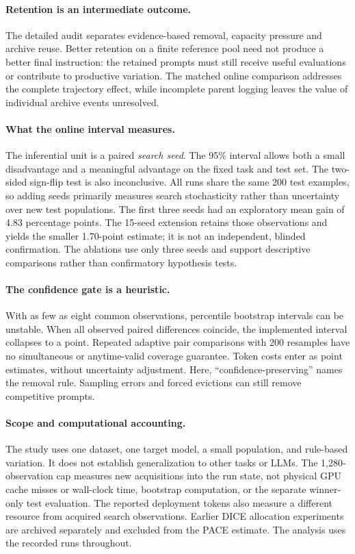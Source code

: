 \documentclass{article}
\begin{document}
\paragraph{Retention is an intermediate outcome.}
The detailed audit separates evidence-based removal, capacity pressure and
archive reuse. Better retention on a finite reference pool need not produce a
better final instruction: the retained prompts must still receive useful
evaluations or contribute to productive variation. The matched online comparison
addresses the complete trajectory effect, while incomplete parent logging leaves
the value of individual archive events unresolved.

\paragraph{What the online interval measures.}
The inferential unit is a paired \emph{search seed}. The 95\% interval allows both
a small disadvantage and a meaningful advantage on the fixed task and test set.
The two-sided sign-flip test is also inconclusive. All runs share the same 200
test examples, so adding seeds primarily measures search stochasticity rather
than uncertainty over new test populations. The first three seeds had an
exploratory mean gain of 4.83 percentage points. The 15-seed extension retains
those observations and yields the smaller 1.70-point estimate; it is not an
independent, blinded confirmation. The ablations use only three seeds and
support descriptive comparisons rather than confirmatory hypothesis tests.

\paragraph{The confidence gate is a heuristic.}
With as few as eight common observations, percentile bootstrap intervals can
be unstable. When all observed paired differences coincide, the implemented
interval collapses to a point. Repeated adaptive pair comparisons with 200
resamples have no simultaneous or anytime-valid coverage guarantee. Token
costs enter as point estimates, without uncertainty adjustment. Here, ``confidence-preserving'' names the removal rule. Sampling errors and
forced evictions can still remove competitive prompts.

\paragraph{Scope and computational accounting.}
The study uses one dataset, one target model, a small population, and rule-based
variation. It does not establish generalization to other tasks or LLMs. The
1,280-observation cap measures new acquisitions into the run state, not physical GPU cache misses or wall-clock time,
bootstrap computation, or the separate winner-only test evaluation. The reported
deployment tokens also measure a different resource from acquired search observations.
Earlier DICE allocation experiments are archived separately and excluded from
the PACE estimate. The analysis uses the recorded runs throughout.
\end{document}
